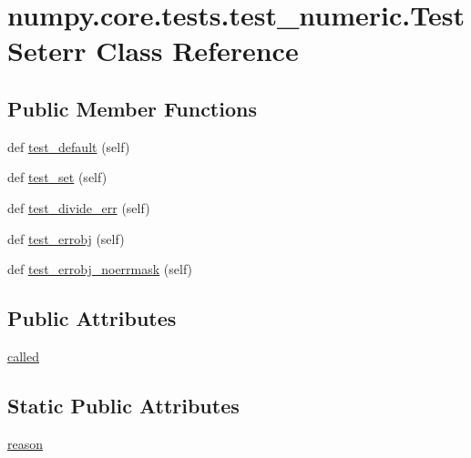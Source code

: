 \hypertarget{classnumpy_1_1core_1_1tests_1_1test__numeric_1_1TestSeterr}{}\section{numpy.\+core.\+tests.\+test\+\_\+numeric.\+Test\+Seterr Class Reference}
\label{classnumpy_1_1core_1_1tests_1_1test__numeric_1_1TestSeterr}
\subsection*{Public Member Functions}
\begin{DoxyCompactItemize}
\item 
def \hyperlink{classnumpy_1_1core_1_1tests_1_1test__numeric_1_1TestSeterr_a624079a98b9181eba0316e68e3bc79f3}{test\+\_\+default} (self)
\item 
def \hyperlink{classnumpy_1_1core_1_1tests_1_1test__numeric_1_1TestSeterr_ad2abe0db37214a809df146642cc2eaf3}{test\+\_\+set} (self)
\item 
def \hyperlink{classnumpy_1_1core_1_1tests_1_1test__numeric_1_1TestSeterr_aa20cd10cde7703abb937f4895e5f5b45}{test\+\_\+divide\+\_\+err} (self)
\item 
def \hyperlink{classnumpy_1_1core_1_1tests_1_1test__numeric_1_1TestSeterr_ab54de4568b9175e666fc2248a79eed38}{test\+\_\+errobj} (self)
\item 
def \hyperlink{classnumpy_1_1core_1_1tests_1_1test__numeric_1_1TestSeterr_a4b5c652a070bfd6145869960a8303805}{test\+\_\+errobj\+\_\+noerrmask} (self)
\end{DoxyCompactItemize}
\subsection*{Public Attributes}
\begin{DoxyCompactItemize}
\item 
\hyperlink{classnumpy_1_1core_1_1tests_1_1test__numeric_1_1TestSeterr_ae1488fdd9771a1f4f31490e41a180e3c}{called}
\end{DoxyCompactItemize}
\subsection*{Static Public Attributes}
\begin{DoxyCompactItemize}
\item 
\hyperlink{classnumpy_1_1core_1_1tests_1_1test__numeric_1_1TestSeterr_abf5e5f149d3c162c7af5de0a7a445813}{reason}
\end{DoxyCompactItemize}


